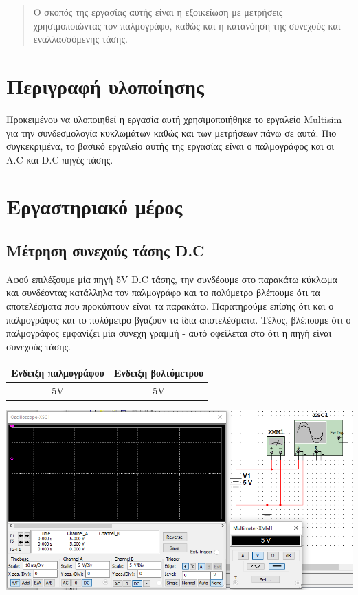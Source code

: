 \documentclass{article}
\begin{document}
\begin{titlepage}
\maketitle
\end{titlepage}

\renewcommand{\contentsname}{Περιεχόμενα}
\tableofcontents

\renewcommand{\abstractname}{Εισαγωγή}
\begin{abstract}
        Ο σκοπός της εργασίας αυτής είναι η εξοικείωση με μετρήσεις χρησιμοποιώντας
        τον παλμογράφο, καθώς και η κατανόηση της συνεχούς και εναλλασσόμενης τάσης.
\end{abstract}
\pagebreak

\section{Περιγραφή υλοποίησης}
Προκειμένου να υλοποιηθεί η εργασία αυτή χρησιμοποιήθηκε το εργαλείο Multisim για την
συνδεσμολογία κυκλωμάτων καθώς και των μετρήσεων πάνω σε αυτά. Πιο συγκεκριμένα,
το βασικό εργαλείο αυτής της εργασίας είναι ο παλμογράφος και οι A.C και D.C πηγές
τάσης.

\section{Εργαστηριακό μέρος}
\subsection{Μέτρηση συνεχούς τάσης D.C}
Αφού επιλέξουμε μία πηγή 5V D.C τάσης, την συνδέουμε στο παρακάτω
κύκλωμα και συνδέοντας κατάλληλα τον παλμογράφο και το πολύμετρο
βλέπουμε ότι τα αποτελέσματα που προκύπτουν είναι τα παρακάτω.
Παρατηρούμε επίσης ότι και ο παλμογράφος και το πολύμετρο βγάζουν
τα ίδια αποτελέσματα. Τέλος, βλέπουμε ότι ο παλμογράφος εμφανίζει
μία συνεχή γραμμή - αυτό οφείλεται στο ότι η πηγή είναι συνεχούς
τάσης.

\begin{center}
\begin{tabular}{|c|c|}
        \hline
        Eνδειξη παλμογράφου & Eνδειξη βολτόμετρου \\
        \hline
        5V & 5V \\
        \hline
\end{tabular}
\end{center}

\includegraphics[width=\textwidth]{./res/ex1circ.png} \\
\end{document}
